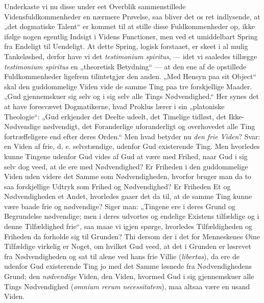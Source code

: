 \documentclass[11pt]{book}
\newcommand{\opage}[1]{\marginnote{\footnotesize\textit{[#1]}}}
\begin{document}
Underkaste vi nu disse under eet Overblik sammenstillede
Vidensfuldkommenheder en nærmere Prøvelse, saa bliver det os ret
indlysende, at „det dogmatiske Talent“ er kommet til at stille disse
Fuldkommenheder op, ikke ifølge nogen egentlig Indsigt i Videns
Functioner, men ved et umiddelbart Spring fra Endeligt til Uendeligt. At
dette Spring, logisk forstaaet, er skeet i al mulig Tankeløshed, derfor
have vi det \textit{testimonium spiritus}, --- idet vi saaledes tillægge
\textit{testimonium spiritus} en „theoretisk Betydning“ --- at den ene
af de opstillede Fuldkommenheder ligefrem tilintetgjør den anden. „Med
Hensyn paa sit Object“ skal den guddommelige Viden vide de samme Ting
paa tre forskjellige Maader. „Gud gjennemskuer sig selv og i sig selv
alle Tings Nødvendighed.“ Her synes det at have foresvævet
Dogmatikerne, hvad Proklus lærer i sin „platoniske Theologie“: „Gud
erkjender det Deelte udeelt, det Timelige tidløst, det Ikke-Nødvendige
nødvendigt, det Foranderlige uforanderligt og overhovedet alle Ting
fortræffeligere end efter deres Orden.“ Men hvad betyder nu \emph{den
frie Viden}? Svar: en Viden af frie, d. e. selvstændige, udenfor Gud
existerende Ting. Men hvorledes kunne Tingene udenfor Gud vides af Gud
at være med Frihed, naar Gud i sig selv dog veed, at de ere med
Nødvendighed? Er Friheden i den guddommelige Viden uden videre det
Samme som Nødvendigheden, hvorfor bruger man da to saa forskjellige
Udtryk som Frihed og Nødvendighed? Er Friheden Et og
\opage{236} \setcounter{footnote}{0}%
Nødvendigheden et Andet, hvorledes gaaer det da til, at de samme Ting
kunne være baade frie og nødvendige? Siger man: „Tingene ere i deres
Grund og Begrundelse nødvendige; men i deres udvortes og endelige
Existens tilfældige og i denne Tilfældighed frie“, saa maae vi igjen
spørge, hvorledes Tilfældigheden og Friheden da forholde sig til
Grunden? Thi dersom der i det for Menneskenes Øine Tilfældige virkelig
er Noget, om hvilket Gud veed, at det i Grunden er løsrevet fra
Nødvendigheden og sat til alene ved hans frie Villie
(\textit{libertas}), da ere de udenfor Gud existerende Ting jo med det
Samme løsnede fra Nødvendighedens Grund; den \emph{nødvendige} Viden,
den Viden, hvormed Gud i sig gjennemskuer alle Tings Nødvendighed
(\textit{omnium rerum necessitatem}), maa altsaa være en usand Viden.
\end{document}
